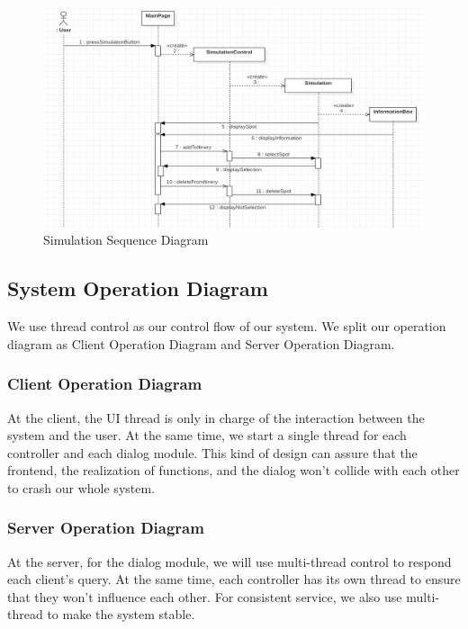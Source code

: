 \documentclass[10pt]{article}
\begin{document}
\begin{figure}[H]
    \centering
    
    \includegraphics[width=14cm]{simulation.png}
    \caption{Simulation Sequence Diagram}
    \label{Simulation Sequence Diagram}
\end{figure}

\subsection{System Operation Diagram}
We use thread control as our control flow of our system. We split our operation diagram as Client Operation Diagram and Server Operation Diagram.

\subsubsection{Client Operation Diagram}
At the client, the UI thread is only in charge of the interaction between the system and the user. At the same time, we start a single thread for each controller and each dialog module. This kind of design can assure that the frontend, the realization of functions, and the dialog won’t collide with each other to crash our whole system.

\subsubsection{Server Operation Diagram}
At the server, for the dialog module, we will use multi-thread control to respond each client’s query. At the same time, each controller has its own thread to ensure that they won’t influence each other. For consistent service, we also use multi-thread to make the system stable.
\end{document}
